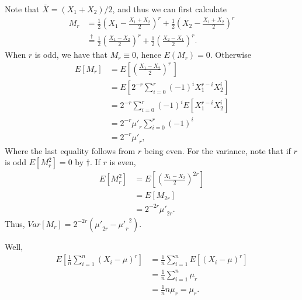 \documentclass{homework}
\begin{document}
  

  \begin{solution}
  Note that $\bar X = (X_1 + X_2)/2$, and thus we can first calculate
  \begin{align*}
    M_r 
    &= \frac 12 \left(X_1 - \frac{X_1 + X_2}{2}\right)^r + \frac12 \left(X_2 - \frac{X_1 + X_2}{2}\right)^r\\
    &\stackrel{\dagger}{=} \frac 12 \left(\frac{X_1 - X_2}{2}\right)^r + \frac12 \left(\frac{X_2 - X_1}{2}\right)^r.
  \end{align*} 
  When $r$ is odd, we have that $M_r \equiv 0$, hence $E(M_r) = 0$.  Otherwise
  \begin{align*}
  E[M_r] 
    &= E\left[\left(\frac{X_1 - X_2}{2}\right)^r\, \right]\\
    &= E\left[2^{-r}\sum_{i=0}^r (-1)^i X_1^{r-i} X_2^i \right]\\
    &= 2^{-r}\sum_{i=0}^r (-1)^i E\left[X_1^{r-i}X_2^i\right]  \\
    &= 2^{-r}{\mu'}_{r}\sum_{i=0}^r (-1)^i\\
    &= 2^{-r}{\mu'}_{r},
  \end{align*} 
  Where the last equality follows from $r$ being even. For the variance, note that if $r$ is odd $E\left[M_r^2\right] = 0$ by $\dagger$.  If $r$ is even, 
  \begin{align*}
    E\left[M_r^2\right] &= E\left[ \left(\frac{X_1 - X_2}{2}\right)^{2r}\right] \\ & = E\left[ M_{2r} \right]\\
    & = 2^{-2r} {\mu'}_{2r}.
  \end{align*}
  Thus, $Var[M_r] = 2^{-2r}({\mu'}_{2r} - {{\mu'}_r}^2).$

  \end{solution}


  \begin{solution}
  Well, 
  \begin{align*}
    E\left[\frac 1n \sum_{i=1}^n \left(X_i - \mu\right)^r\right] 
    &= \frac 1n \sum_{i=1}^nE\left[ \left(X_i - \mu\right)^r\right] \\
    &= \frac 1n \sum_{i=1}^n \mu_r \\
    &= \frac 1n n \mu_r = \mu_r. 
  \end{align*}
  \end{solution}
\end{document}
